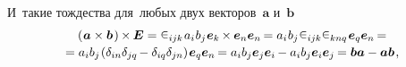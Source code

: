 \begin{otherlanguage}{russian}
И~такие тождества для~любых двух векторов~$\bm{a}$ и~$\bm{b}$
\nopagebreak\vspace{-0.2em}
\begin{multline}\label{vectorcrossvectorcrossidentity}
\left(\hspace{0.1ex} \bm{a} \times \bm{b} \hspace{0.2ex}\right) \hspace{-0.1ex} \times \hspace{-0.1ex} \bm{E}
= \levicivita_{ijk} \hspace{0.2ex} a_i \hspace{0.1ex} b_j \hspace{0.1ex} \bm{e}_k \hspace{-0.16ex} \times \hspace{-0.1ex} \bm{e}_n \bm{e}_n \hspace{-0.2ex}
= a_i \hspace{0.1ex} b_j \hspace{.1ex} \levicivita_{ijk} \levicivita_{knq} \hspace{.2ex} \bm{e}_q \bm{e}_n \hspace{-0.2ex} = \\[-0.1em]
%
= a_i b_j \hspace{-0.2ex} \left( \delta_{in} \delta_{jq} \hspace{-0.2ex} - \delta_{iq} \delta_{jn} \right) \hspace{-0.2ex} \bm{e}_q \bm{e}_n \hspace{-0.2ex}
= a_i b_j \bm{e}_j \bm{e}_i \hspace{-0.12ex} - a_i b_j \bm{e}_i \bm{e}_j \hspace{-0.16ex}
= \bm{b} \bm{a} - \bm{a} \bm{b} \hspace{0.2ex},
\end{multline}


\end{otherlanguage}
